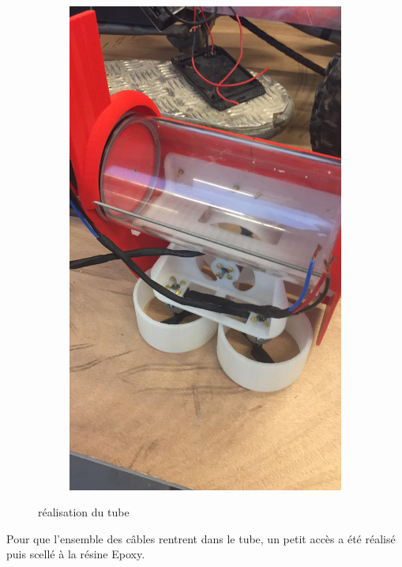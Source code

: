 \documentclass[a4paper,11pt]{report}
\begin{document}
\begin{figure}[!h]
\begin{subfigure}[b]{0.3\textwidth}
							\end{subfigure}
							\begin{subfigure}[b]{0.3\textwidth}
								\includegraphics[width=\textwidth]{Photos/Capture8.jpeg}
							\end{subfigure}
							\caption{réalisation du tube}
					\end{figure}\newline
					
		Pour que l'ensemble des câbles rentrent dans le tube, un petit accès a été réalisé puis scellé à la résine Epoxy.
		
\end{document}
